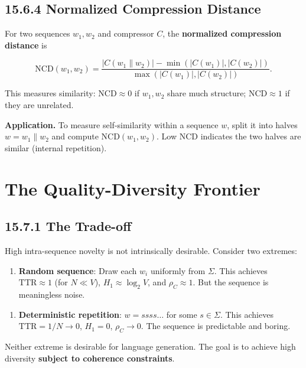 \subsection{15.6.4 Normalized Compression Distance}

\begin{definition}[NCD]
For two sequences $w_1, w_2$ and compressor $C$, the \textbf{normalized compression distance} is

\[\mathrm{NCD}(w_1, w_2) = \frac{|C(w_1 \| w_2)| - \min(|C(w_1)|, |C(w_2)|)}{\max(|C(w_1)|, |C(w_2)|)}.\]

This measures similarity: $\mathrm{NCD} \approx 0$ if $w_1, w_2$ share much structure; $\mathrm{NCD} \approx 1$ if they are unrelated.

\textbf{Application.} To measure self-similarity within a sequence $w$, split it into halves $w = w_1 \| w_2$ and compute $\mathrm{NCD}(w_1, w_2)$. Low NCD indicates the two halves are similar (internal repetition).
\end{definition}



\section{The Quality-Diversity Frontier}

\subsection{15.7.1 The Trade-off}

High intra-sequence novelty is not intrinsically desirable. Consider two extremes:

\begin{enumerate}
\item \textbf{Random sequence}: Draw each $w_i$ uniformly from $\Sigma$. This achieves $\mathrm{TTR} \approx 1$ (for $N \ll V$), $H_1 \approx \log_2 V$, and $\rho_C \approx 1$. But the sequence is meaningless noise.
\end{enumerate}

\begin{enumerate}
\item \textbf{Deterministic repetition}: $w = ssss\ldots$ for some $s \in \Sigma$. This achieves $\mathrm{TTR} = 1/N \to 0$, $H_1 = 0$, $\rho_C \to 0$. The sequence is predictable and boring.
\end{enumerate}

Neither extreme is desirable for language generation. The goal is to achieve high diversity \textbf{subject to coherence constraints}.

